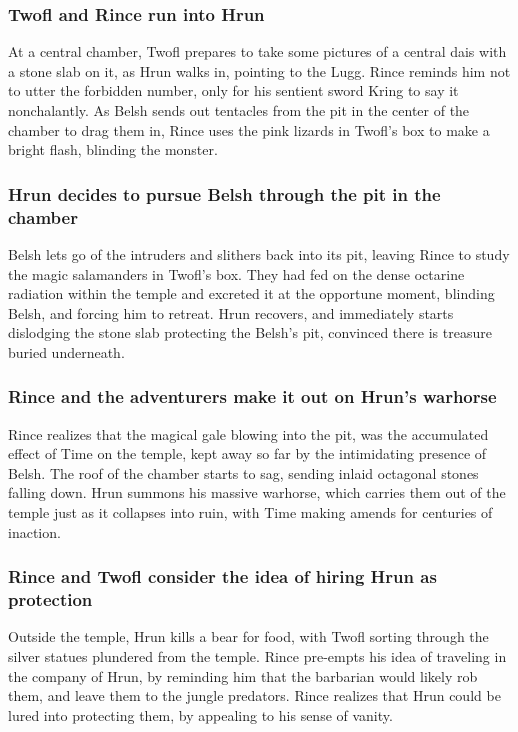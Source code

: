 \subsubsection{\Gls{Twofl} and \Gls{Rince} run into \Gls{Hrun}}
At a central chamber, \Gls{Twofl} prepares to take some pictures of a central dais with a stone slab
on it, as \Gls{Hrun} walks in, pointing to the \Gls{Lugg}. \Gls{Rince} reminds him not to utter the
forbidden number, only for his sentient sword \Gls{Kring} to say it nonchalantly. As \Gls{Belsh}
sends out tentacles from the pit in the center of the chamber to drag them in, \Gls{Rince} uses the
pink lizards in \Gls{Twofl}'s box to make a bright flash, blinding the monster.

\subsubsection{\Gls{Hrun} decides to pursue \Gls{Belsh} through the pit in the chamber}
\Gls{Belsh} lets go of the intruders and slithers back into its pit, leaving \Gls{Rince} to study
the magic salamanders in \Gls{Twofl}'s box. They had fed on the dense octarine radiation within the
temple and excreted it at the opportune moment, blinding \Gls{Belsh}, and forcing him to retreat.
\Gls{Hrun} recovers, and immediately starts dislodging the stone slab protecting the \Gls{Belsh}'s
pit, convinced there is treasure buried underneath.

\subsubsection{\Gls{Rince} and the adventurers make it out on \Gls{Hrun}'s warhorse}
\Gls{Rince} realizes that the magical gale blowing into the pit, was the accumulated effect of
Time on the temple, kept away so far by the intimidating presence of \Gls{Belsh}. The roof of the
chamber starts to sag, sending inlaid octagonal stones falling down. \Gls{Hrun} summons his massive
warhorse, which carries them out of the temple just as it collapses into ruin, with Time making
amends for centuries of inaction.

\subsubsection{\Gls{Rince} and \Gls{Twofl} consider the idea of hiring \Gls{Hrun} as protection}
Outside the temple, \Gls{Hrun} kills a bear for food, with \Gls{Twofl} sorting through the
silver statues plundered from the temple. \Gls{Rince} pre-empts his idea of traveling in the
company of \Gls{Hrun}, by reminding him that the barbarian would likely rob them, and leave them to
the jungle predators. \Gls{Rince} realizes that \Gls{Hrun} could be lured into protecting them,
by appealing to his sense of vanity.

